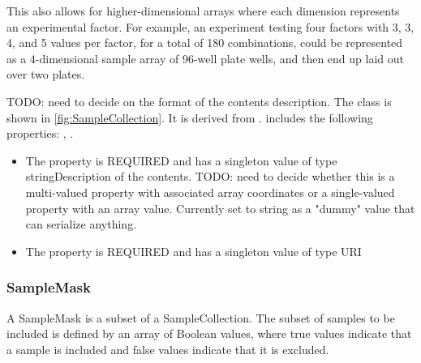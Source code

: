         This also allows for higher-dimensional arrays where each dimension represents an experimental factor.
        For example, an experiment testing four factors with 3, 3, 4, and 5 values per factor, for a total of 180
        combinations, could be represented as a 4-dimensional sample array of 96-well plate wells, and then end up
        laid out over two plates.

        TODO: need to decide on the format of the contents description.%
\linebreak%
\linebreak%
The  class is shown in \ref{fig:SampleCollection}. It is derived from .%
 includes the following properties: , . %
\begin{itemize}%
\item%
The  property is REQUIRED and has a singleton value of type stringDescription of the contents.
        TODO: need to decide whether this is a multi-valued property with associated array coordinates or a
        single-valued property with an array value.
        Currently set to string as a "dummy" value that can serialize anything.%
\item%
The  property is REQUIRED and has a singleton value of type URI%
\end{itemize}%
\subsubsection{SampleMask}%
\label{sec:paml:SampleMask}%
A SampleMask is a subset of a SampleCollection. The subset of samples to be included is defined
        by an array of Boolean values, where true values indicate that a sample is included and false values indicate
        that it is excluded.


